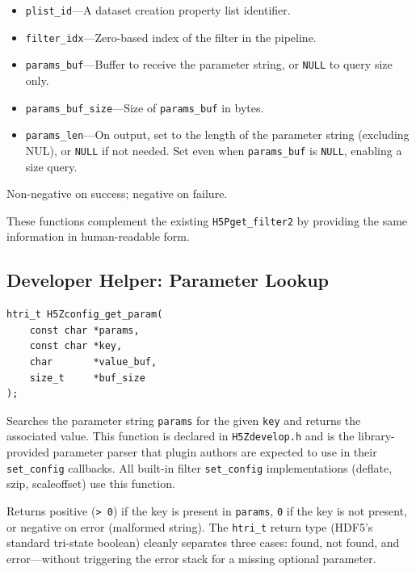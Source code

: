 \documentclass[../HDF5_RFC.tex]{subfiles}
\begin{document}

\begin{itemize}
\item \texttt{plist\_id}---A dataset creation property list identifier.
\item \texttt{filter\_idx}---Zero-based index of the filter in the pipeline.
\item \texttt{params\_buf}---Buffer to receive the parameter string, or \texttt{NULL}
  to query size only.
\item \texttt{params\_buf\_size}---Size of \texttt{params\_buf} in bytes.
\item \texttt{params\_len}---On output, set to the length of the parameter string
  (excluding NUL), or \texttt{NULL} if not needed. Set even when \texttt{params\_buf}
  is \texttt{NULL}, enabling a size query.
\end{itemize}

Non-negative on success; negative on failure.

These functions complement the existing \texttt{H5Pget\_filter2} by providing the same
information in human-readable form.


\subsection{Developer Helper: Parameter Lookup}
\label{sec:config-get-param}

\begin{verbatim}
htri_t H5Zconfig_get_param(
    const char *params,
    const char *key,
    char       *value_buf,
    size_t     *buf_size
);
\end{verbatim}

Searches the parameter string \texttt{params} for the given \texttt{key}
and returns the associated value. This function is declared in
\texttt{H5Zdevelop.h} and is the library-provided parameter parser that plugin
authors are expected to use in their \texttt{set\_config} callbacks. All built-in
filter \texttt{set\_config} implementations (deflate, szip, scaleoffset) use this
function.

Returns positive (\texttt{> 0}) if the key is present in \texttt{params}, \texttt{0} if the key
is not present, or negative on error (malformed string). The \texttt{htri\_t} return
type (HDF5's standard tri-state boolean) cleanly separates three cases: found,
not found, and error---without triggering the error stack for a missing
optional parameter.
\end{document}

